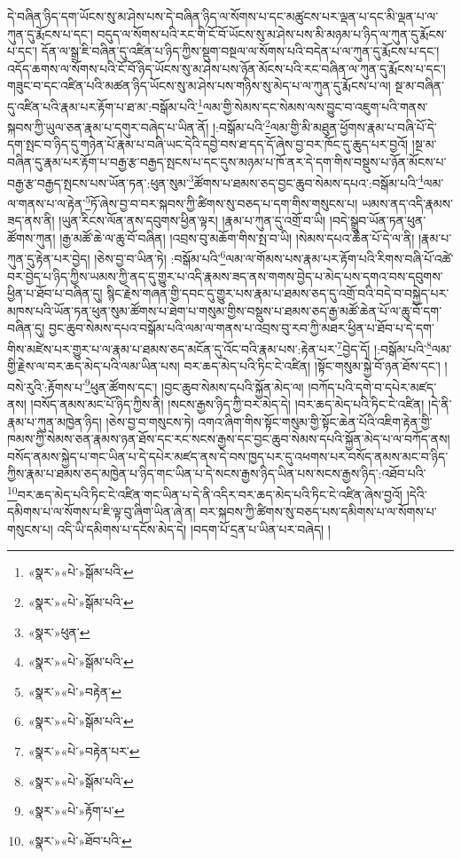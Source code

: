 དེ་བཞིན་ཉིད་དག་ཡོངས་སུ་མ་ཤེས་པས་དེ་བཞིན་ཉིད་ལ་སོགས་པ་དང་མཚུངས་པར་ལྡན་པ་དང་མི་ལྡན་པ་ལ་ཀུན་དུ་རྨོངས་པ་དང་། བདུད་ལ་སོགས་པའི་རང་གི་ངོ་བོ་ཡོངས་སུ་མ་ཤེས་པས་མི་མཉམ་པ་ཉིད་ལ་ཀུན་དུ་རྨོངས་པ་དང་། དོན་ལ་སྒྲ་ཇི་བཞིན་དུ་འཛིན་པ་ཉིད་ཀྱིས་སྡུག་བསྔལ་ལ་སོགས་པའི་བདེན་པ་ལ་ཀུན་དུ་རྨོངས་པ་དང་། འདོད་ཆགས་ལ་སོགས་པའི་ངོ་བོ་ཉིད་ཡོངས་སུ་མ་ཤེས་པས་ཉོན་མོངས་པའི་རང་བཞིན་ལ་ཀུན་དུ་རྨོངས་པ་དང་། གཟུང་བ་དང་འཛིན་པའི་མཚན་ཉིད་ཡོངས་སུ་མ་ཤེས་པས་གཉིས་སུ་མེད་པ་ལ་ཀུན་དུ་རྨོངས་པ་ལ། སྔ་མ་བཞིན་དུ་འཛིན་པའི་རྣམ་པར་རྟོག་པ་ཐ་མ་:བསྒོམ་པའི་\footnote{«སྣར་»«པེ་»སྒོམ་པའི་}ལམ་གྱི་སེམས་དང་སེམས་ལས་བྱུང་བ་འཇུག་པའི་གནས་སྐབས་ཀྱི་ཡུལ་ཅན་རྣམ་པ་དགུར་བཞེད་པ་ཡིན་ནོ། །:བསྒོམ་པའི་\footnote{«སྣར་»«པེ་»སྒོམ་པའི་}ལམ་གྱི་མི་མཐུན་ཕྱོགས་རྣམ་པ་བཞི་པོ་དེ་དག་སྤང་བ་ཉིད་དུ་གཉེན་པོ་རྣམ་པ་བཞི་ཡང་དེའི་དབྱེ་བས་ཐ་དད་དོ་ཞེས་བྱ་བར་ཁོང་དུ་ཆུད་པར་བྱའོ། །སྔ་མ་བཞིན་དུ་རྣམ་པར་རྟོག་པ་བརྒྱ་རྩ་བརྒྱད་སྤངས་པ་དང་དུས་མཉམ་པ་ཁོ་ནར་དེ་དག་གིས་བསྡུས་པ་ཉོན་མོངས་པ་བརྒྱ་རྩ་བརྒྱད་སྤངས་པས་ཡོན་ཏན་:ཕུན་སུམ་\footnote{«སྣར་»ཕུན་}ཚོགས་པ་ཐམས་ཅད་བྱང་ཆུབ་སེམས་དཔའ་:བསྒོམ་པའི་\footnote{«སྣར་»«པེ་»སྒོམ་པའི་}ལམ་ལ་གནས་པ་ལ་རྟེན་\footnote{«སྣར་»«པེ་»བརྟེན་}ཏོ་ཞེས་བྱ་བ་བར་སྐབས་ཀྱི་ཚིགས་སུ་བཅད་པ་དག་གིས་གསུངས་པ། ཡམས་ནད་འདི་རྣམས་ཟད་ནས་ནི། །ཡུན་རིངས་ལོན་ནས་དབུགས་ཕྱིན་ལྟར། །རྣམ་པ་ཀུན་དུ་འགྲོ་བ་ཡི། །བདེ་སྒྲུབ་ཡོན་ཏན་ཕུན་ཚོགས་ཀུན། །རྒྱ་མཚོ་ཆེ་ལ་ཆུ་བོ་བཞིན། །འབྲས་བུ་མཆོག་གིས་སྤ་བ་ཡི། །སེམས་དཔའ་ཆེན་པོ་དེ་ལ་ནི། །རྣམ་པ་ཀུན་དུ་རྟེན་པར་བྱེད། །ཅེས་བྱ་བ་ཡིན་ཏེ། :བསྒོམ་པའི་\footnote{«སྣར་»«པེ་»སྒོམ་པའི་}ལམ་ལ་གོམས་པས་རྣམ་པར་རྟོག་པའི་རིགས་བཞི་པོ་འཚེ་བར་བྱེད་པ་ཉིད་ཀྱིས་ཡམས་ཀྱི་ནད་དུ་གྱུར་པ་འདི་རྣམས་ཟད་ནས་གགས་བྱེད་པ་མེད་པས་དགའ་བས་དབུགས་ཕྱིན་པ་ཐོབ་པ་བཞིན་དུ། སྙིང་རྗེས་གཞན་གྱི་དབང་དུ་གྱུར་པས་རྣམ་པ་ཐམས་ཅད་དུ་འགྲོ་བའི་བདེ་བ་བསྐྱེད་པར་མཁས་པའི་ཡོན་ཏན་ཕུན་སུམ་ཚོགས་པ་ཐེག་པ་གསུམ་གྱིས་བསྡུས་པ་ཐམས་ཅད་རྒྱ་མཚོ་ཆེན་པོ་ལ་ཆུ་བོ་དག་བཞིན་དུ། བྱང་ཆུབ་སེམས་དཔའ་བསྒོམ་པའི་ལམ་ལ་གནས་པ་འབྲས་བུ་རབ་ཀྱི་མཐར་ཕྱིན་པ་ཐོབ་པ་དེ་དག་གིས་མཛེས་པར་གྱུར་པ་ལ་རྣམ་པ་ཐམས་ཅད་མངོན་དུ་འོང་བའི་རྣམ་པས་:རྟེན་པར་\footnote{«སྣར་»«པེ་»བརྟེན་པར་}བྱེད་དོ། །:བསྒོམ་པའི་\footnote{«སྣར་»«པེ་»སྒོམ་པའི་}ལམ་གྱི་རྗེས་ལ་བར་ཆད་མེད་པའི་ལམ་ཡིན་པས། བར་ཆད་མེད་པའི་ཏིང་ངེ་འཛིན། །སྟོང་གསུམ་སྐྱེ་བོ་ཉན་ཐོས་དང་། །བསེ་རུའི་:རྟོགས་པ་\footnote{«སྣར་»«པེ་»རྟོག་པ་}ཕུན་ཚོགས་དང་། །བྱང་ཆུབ་སེམས་དཔའི་སྐྱོན་མེད་ལ། །བཀོད་པའི་དགེ་བ་དཔེར་མཛད་ནས། །བསོད་ནམས་མང་པོ་ཉིད་ཀྱིས་ནི། །སངས་རྒྱས་ཉིད་ཀྱི་བར་མེད་དེ། །བར་ཆད་མེད་པའི་ཏིང་ངེ་འཛིན། །དེ་ནི་རྣམ་པ་ཀུན་མཁྱེན་ཉིད། །ཅེས་བྱ་བ་གསུངས་ཏེ། འགའ་ཞིག་གིས་སྟོང་གསུམ་གྱི་སྟོང་ཆེན་པོའི་འཇིག་རྟེན་གྱི་ཁམས་ཀྱི་སེམས་ཅན་རྣམས་ཉན་ཐོས་དང་རང་སངས་རྒྱས་དང་བྱང་ཆུབ་སེམས་དཔའི་སྐྱོན་མེད་པ་ལ་བཀོད་ནས། བསོད་ནམས་སྐྱེད་པ་གང་ཡིན་པ་དེ་དཔེར་མཛད་ནས་དེ་བས་ཁྱད་པར་དུ་འཕགས་པར་བསོད་ནམས་མང་བ་ཉིད་ཀྱིས་རྣམ་པ་ཐམས་ཅད་མཁྱེན་པ་ཉིད་གང་ཡིན་པ་དེ་སངས་རྒྱས་ཉིད་ཡིན་པས་སངས་རྒྱས་ཉིད་:འཐོབ་པའི་\footnote{«སྣར་»«པེ་»ཐོབ་པའི་}བར་ཆད་མེད་པའི་ཏིང་ངེ་འཛིན་གང་ཡིན་པ་དེ་ནི་འདིར་བར་ཆད་མེད་པའི་ཏིང་ངེ་འཛིན་ཞེས་བྱའོ། །དེའི་དམིགས་པ་ལ་སོགས་པ་ཇི་ལྟ་བུ་ཞིག་ཡིན་ཞེ་ན། བར་སྐབས་ཀྱི་ཚིགས་སུ་བཅད་པས་དམིགས་པ་ལ་སོགས་པ་གསུངས་པ། འདི་ཡི་དམིགས་པ་དངོས་མེད་དེ། །བདག་པོ་དྲན་པ་ཡིན་པར་བཞེད། །
